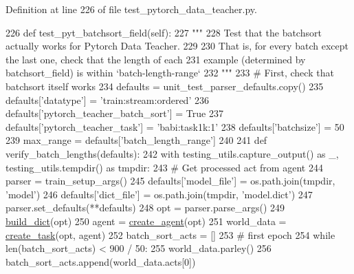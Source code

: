 Definition at line 226 of file test\+\_\+pytorch\+\_\+data\+\_\+teacher.\+py.


\begin{DoxyCode}
226     \textcolor{keyword}{def }test\_pyt\_batchsort\_field(self):
227         \textcolor{stringliteral}{"""}
228 \textcolor{stringliteral}{        Test that the batchsort actually works for Pytorch Data Teacher.}
229 \textcolor{stringliteral}{}
230 \textcolor{stringliteral}{        That is, for every batch except the last one, check that the length of each}
231 \textcolor{stringliteral}{        example (determined by batchsort\_field) is within `batch-length-range`}
232 \textcolor{stringliteral}{        """}
233         \textcolor{comment}{# First, check that batchsort itself works}
234         defaults = unit\_test\_parser\_defaults.copy()
235         defaults[\textcolor{stringliteral}{'datatype'}] = \textcolor{stringliteral}{'train:stream:ordered'}
236         defaults[\textcolor{stringliteral}{'pytorch\_teacher\_batch\_sort'}] = \textcolor{keyword}{True}
237         defaults[\textcolor{stringliteral}{'pytorch\_teacher\_task'}] = \textcolor{stringliteral}{'babi:task1k:1'}
238         defaults[\textcolor{stringliteral}{'batchsize'}] = 50
239         max\_range = defaults[\textcolor{stringliteral}{'batch\_length\_range'}]
240 
241         \textcolor{keyword}{def }verify\_batch\_lengths(defaults):
242             with testing\_utils.capture\_output() \textcolor{keyword}{as} \_, testing\_utils.tempdir() \textcolor{keyword}{as} tmpdir:
243                 \textcolor{comment}{# Get processed act from agent}
244                 parser = train\_setup\_args()
245                 defaults[\textcolor{stringliteral}{'model\_file'}] = os.path.join(tmpdir, \textcolor{stringliteral}{'model'})
246                 defaults[\textcolor{stringliteral}{'dict\_file'}] = os.path.join(tmpdir, \textcolor{stringliteral}{'model.dict'})
247                 parser.set\_defaults(**defaults)
248                 opt = parser.parse\_args()
249                 \hyperlink{namespacebuild__dict}{build\_dict}(opt)
250                 agent = \hyperlink{namespaceparlai_1_1core_1_1agents_ad0d54074d4bcc148bb415ab5515a53b5}{create\_agent}(opt)
251                 world\_data = \hyperlink{namespaceparlai_1_1core_1_1worlds_a11923c10b545c7ecc1b08fe2242d9c2c}{create\_task}(opt, agent)
252                 batch\_sort\_acts = []
253                 \textcolor{comment}{# first epoch}
254                 \textcolor{keywordflow}{while} len(batch\_sort\_acts) < 900 / 50:
255                     world\_data.parley()
256                     batch\_sort\_acts.append(world\_data.acts[0])

\end{DoxyCode}
